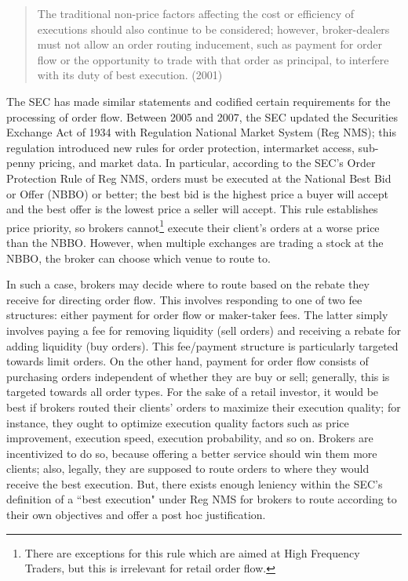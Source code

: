 \documentclass[12pt,a4paper]{article}
\begin{document}
\begin{quote}
	The traditional non-price factors affecting the cost or efficiency of executions should also continue to be considered; however, broker-dealers must not allow an order routing inducement, such as payment for order flow or the opportunity to trade with that order as principal, to interfere with its duty of best execution. (2001)
\end{quote}
The SEC has made similar statements and codified certain requirements for the processing of order flow. Between 2005 and 2007, the SEC updated the Securities Exchange Act of 1934 with Regulation National Market System (Reg NMS); this regulation introduced new rules for order protection, intermarket access, sub-penny pricing, and market data. In particular, according to the SEC's Order Protection Rule of Reg NMS, orders must be executed at the National Best Bid or Offer (NBBO) or better; the best bid is the highest price a buyer will accept and the best offer is the lowest price a seller will accept. This rule establishes price priority, so brokers cannot\footnote{ There are exceptions for this rule which are aimed at High Frequency Traders, but this is irrelevant for retail order flow.} execute their client's orders at a worse price than the NBBO. However, when multiple exchanges are trading a stock at the NBBO, the broker can choose which venue to route to. 

In such a case, brokers may decide where to route based on the rebate they receive for directing order flow. This involves responding to one of two fee structures: either payment for order flow or maker-taker fees. The latter simply involves paying a fee for removing liquidity (sell orders) and receiving a rebate for adding liquidity (buy orders). This fee/payment structure is particularly targeted towards limit orders. On the other hand, payment for order flow consists of purchasing orders independent of whether they are buy or sell; generally, this is targeted towards all order types. 
For the sake of a retail investor, it would be best if brokers routed their clients' orders to maximize their execution quality; 
for instance, they ought to optimize execution quality factors such as price improvement, execution speed, execution probability, and so on. Brokers are incentivized to do so, because offering a better service should win them more clients; also, legally, they are supposed to route orders to where they would receive the best execution. But, there exists enough leniency within the SEC's definition of a ``best execution" under Reg NMS for brokers to route according to their own objectives and offer a post hoc justification. 
\end{document}
